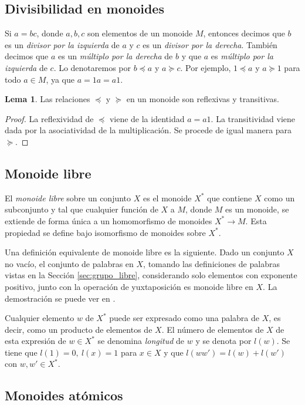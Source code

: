 \documentclass[12pt]{book}
\theoremstyle{definition}
\newtheorem{lema}{Lema}[section]
\begin{document}
\subsection{Divisibilidad en monoides}

Si $a=bc$, donde $a,b,c$ son elementos de un monoide $M$, entonces decimos que $b$ es un \textit{divisor por la izquierda} de $a$ y $c$ es un \textit{divisor por la derecha}. También decimos que $a$ es un \textit{múltiplo por la derecha} de $b$ y que $a$ es \textit{múltiplo por la izquierda} de $c$. Lo denotaremos por $b\preceq a$ y $a\succeq c$. Por ejemplo, $1\preceq a$ y $a\succeq 1$ para todo $a\in M$, ya que $a=1a=a1$.

\begin{lema}
Las relaciones $\preceq$ y $\succeq$ en un monoide son reflexivas y transitivas.
\label{lema:rel1}
\end{lema}

\begin{proof} La reflexividad de $\preceq$ viene de la identidad $a=a1$. La transitividad viene dada por la asociatividad de la multiplicación. Se procede de igual manera para $\succeq$.
\end{proof}

\subsection{Monoide libre}
El \textit{monoide libre} sobre un conjunto $X$ es el monoide $X^*$ que contiene $X$ como un subconjunto y tal que cualquier función de $X$ a $M$, donde $M$ es un monoide, se extiende de forma única a un homomorfismo de monoides $X^*\rightarrow M$. Esta propiedad se define bajo isomorfismo de monoides sobre $X^*$.

Una definición equivalente de monoide libre es la siguiente. Dado un conjunto $X$ no vacío, el conjunto de palabras en $X$, tomando las definiciones de palabras vistas en la Sección \ref{sec:grupo_libre}, considerando solo elementos con exponente positivo, junto con la operación de yuxtaposición es monoide libre en $X$. La demostración se puede ver en \cite{monoides}.


Cualquier elemento $w$ de $X^*$ puede ser expresado como una palabra de $X$, es decir, como un producto de elementos de $X$. El número de elementos de $X$ de esta expresión de $w\in X^*$ se denomina \textit{longitud} de $w$ y se denota por $l(w)$. Se tiene que $l(1)=0,\ l(x)=1$ para $x\in X$ y que $l(ww')=l(w)+l(w')$ con $w,w'\in X^*$.
\label{monoide_libre}
\subsection{Monoides atómicos}
\end{document}
